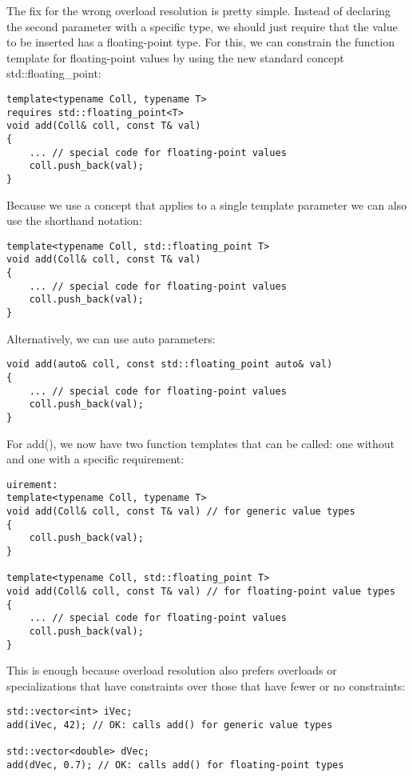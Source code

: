 The fix for the wrong overload resolution is pretty simple. Instead of declaring the second parameter with a specific type, we should just require that the value to be inserted has a floating-point type. For this, we can constrain the function template for floating-point values by using the new standard concept std::floating\_point:

\begin{lstlisting}[style=styleCXX]
template<typename Coll, typename T>
requires std::floating_point<T>
void add(Coll& coll, const T& val)
{
	... // special code for floating-point values
	coll.push_back(val);
}
\end{lstlisting}

Because we use a concept that applies to a single template parameter we can also use the shorthand notation:

\begin{lstlisting}[style=styleCXX]
template<typename Coll, std::floating_point T>
void add(Coll& coll, const T& val)
{
	... // special code for floating-point values
	coll.push_back(val);
}
\end{lstlisting}

Alternatively, we can use auto parameters:

\begin{lstlisting}[style=styleCXX]
void add(auto& coll, const std::floating_point auto& val)
{
	... // special code for floating-point values
	coll.push_back(val);
}
\end{lstlisting}

For add(), we now have two function templates that can be called: one without and one with a specific requirement:

\begin{lstlisting}[style=styleCXX]
uirement:
template<typename Coll, typename T>
void add(Coll& coll, const T& val) // for generic value types
{
	coll.push_back(val);
}

template<typename Coll, std::floating_point T>
void add(Coll& coll, const T& val) // for floating-point value types
{
	... // special code for floating-point values
	coll.push_back(val);
}
\end{lstlisting}

This is enough because overload resolution also prefers overloads or specializations that have constraints over those that have fewer or no constraints:

\begin{lstlisting}[style=styleCXX]
std::vector<int> iVec;
add(iVec, 42); // OK: calls add() for generic value types

std::vector<double> dVec;
add(dVec, 0.7); // OK: calls add() for floating-point types
\end{lstlisting}

